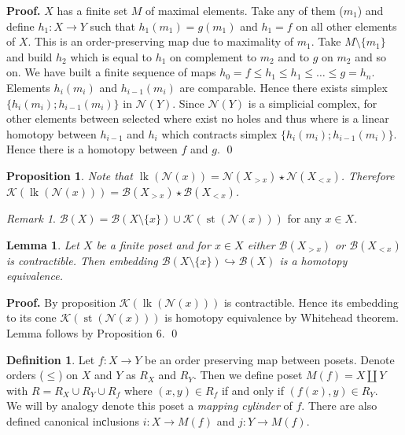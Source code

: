 \documentclass[a4paper, 12pt]{article}
\newtheorem{proposition}{Proposition}
\newtheorem{lemma}{Lemma}
\theoremstyle{definition}
\newtheorem{definition}{Definition}
\theoremstyle{remark}
\newtheorem{remark}{Remark}
\newenvironment{pf}{\noindent\textbf{Proof.}}{\qed}
\newcommand{\define}[1]{{\textit{#1}}}
\renewcommand{\leq}{\leqslant}
\begin{document}
\begin{pf}
  $X$ has a finite set $M$ of maximal elements. Take any of them ($m_1$) and define $h_1 : X \to Y$ such that $h_1(m_1) = g(m_1)$ and $h_1 = f$ on all other elements of $X$. This is an order-preserving map due to maximality of $m_1$. Take $M \setminus \{m_1\}$ and build $h_2$ which is equal to $h_1$ on complement to $m_2$ and to $g$ on $m_2$ and so on. We have built a finite sequence of maps $h_0 = f \leq h_1 \leq h_1 \leq \ldots \leq g = h_n$.\\

  Elements $h_i(m_i)$ and $h_{i-1}(m_i)$ are comparable. Hence there exists simplex $\{h_i(m_i); h_{i-1}(m_i)\}$ in $\mathcal{N}(Y)$. Since $\mathcal{N}(Y)$ is a simplicial complex, for other elements between selected where exist no holes and thus where is a linear homotopy between $h_{i-1}$ and $h_{i}$ which contracts simplex $\{h_i(m_i); h_{i-1}(m_i)\}$.\\

  Hence there is a homotopy between $f$ and $g$.
\end{pf}

\begin{proposition}
  Note that $\operatorname{lk}(\mathcal{N}(x)) = \mathcal{N}(X_{>x}) \star \mathcal{N}(X_{<x})$. Therefore $\mathcal{K}(\operatorname{lk}(\mathcal{N}(x))) = \mathcal{B}(X_{>x}) \star \mathcal{B}(X_{<x})$.
\end{proposition}

\begin{remark}
  $\mathcal{B}(X) = \mathcal{B}(X \setminus \{x\}) \cup \mathcal{K}(\operatorname{st}(\mathcal{N}(x)))$ for any $x \in X$.\\
\end{remark}

\begin{lemma}
  Let $X$ be a finite poset and for $x \in X$ either $\mathcal{B}(X_{>x})$ or $\mathcal{B}(X_{<x})$ is contractible. Then embedding $\mathcal{B}(X \setminus \{x\}) \hookrightarrow \mathcal{B}(X)$ is a homotopy equivalence.
\end{lemma}

\begin{pf}
  By proposition $\mathcal{K}(\operatorname{lk}(\mathcal{N}(x)))$ is contractible. Hence its embedding to its cone $\mathcal{K}(\operatorname{st}(\mathcal{N}(x)))$ is homotopy equivalence by Whitehead theorem. Lemma follows by Proposition 6.
\end{pf}

\begin{definition}
  Let $f : X \to Y$ be an order preserving map between posets. Denote orders ($\leq$) on $X$ and $Y$ as $R_X$ and $R_Y$. Then we define poset $M(f) = X \coprod Y$ with $R = R_X \cup R_Y \cup R_{f}$ where $(x,y) \in R_f$ if and only if $(f(x),y) \in R_Y$.\\

  We will by analogy denote this poset a \define{mapping cylinder} of $f$. There are also defined canonical inсlusions $i : X \to M(f)$ and $j : Y \to M(f)$.
\end{definition}
\end{document}
